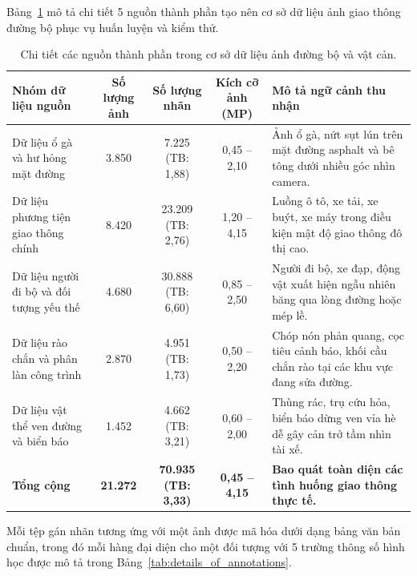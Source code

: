 Bảng~\ref{tab:image_database_sources} mô tả chi tiết 5 nguồn thành phần tạo nên cơ sở dữ liệu ảnh giao thông đường bộ phục vụ huấn luyện và kiểm thử.

\begin{table}[htbp]
\centering
\caption{Chi tiết các nguồn thành phần trong cơ sở dữ liệu ảnh đường bộ và vật cản.}
\label{tab:image_database_sources}
\small
\begin{tabular}{|l|c|c|c|p{5.8cm}|}
\hline
\textbf{Nhóm dữ liệu nguồn} & \textbf{Số lượng ảnh} & \textbf{Số lượng nhãn} & \textbf{Kích cỡ ảnh (MP)} & \textbf{Mô tả ngữ cảnh thu nhận} \\ \hline
Dữ liệu ổ gà và hư hỏng mặt đường & 3.850 & 7.225 (TB: 1,88) & 0,45 -- 2,10 & Ảnh ổ gà, nứt sụt lún trên mặt đường asphalt và bê tông dưới nhiều góc nhìn camera. \\ \hline
Dữ liệu phương tiện giao thông chính & 8.420 & 23.209 (TB: 2,76) & 1,20 -- 4,15 & Luồng ô tô, xe tải, xe buýt, xe máy trong điều kiện mật độ giao thông đô thị cao. \\ \hline
Dữ liệu người đi bộ và đối tượng yếu thế & 4.680 & 30.888 (TB: 6,60) & 0,85 -- 2,50 & Người đi bộ, xe đạp, động vật xuất hiện ngẫu nhiên băng qua lòng đường hoặc mép lề. \\ \hline
Dữ liệu rào chắn và phân làn công trình & 2.870 & 4.951 (TB: 1,73) & 0,50 -- 2,20 & Chóp nón phản quang, cọc tiêu cảnh báo, khối cầu chắn rào tại các khu vực đang sửa đường. \\ \hline
Dữ liệu vật thể ven đường và biển báo & 1.452 & 4.662 (TB: 3,21) & 0,60 -- 2,00 & Thùng rác, trụ cứu hỏa, biển báo dừng ven vỉa hè dễ gây cản trở tầm nhìn tài xế. \\ \hline
\textbf{Tổng cộng} & \textbf{21.272} & \textbf{70.935 (TB: 3,33)} & \textbf{0,45 -- 4,15} & \textbf{Bao quát toàn diện các tình huống giao thông thực tế.} \\ \hline
\end{tabular}
\end{table}

Mỗi tệp gán nhãn tương ứng với một ảnh được mã hóa dưới dạng bảng văn bản chuẩn, trong đó mỗi hàng đại diện cho một đối tượng với 5 trường thông số hình học được mô tả trong Bảng~\ref{tab:details_of_annotations}.


